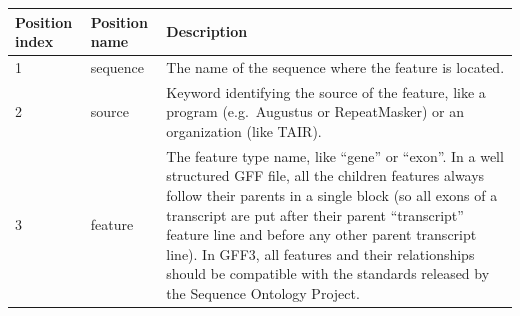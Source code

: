 \documentclass[]{book}
\begin{document}
\begin{longtable}[]{@{}lll@{}}
\toprule
\begin{minipage}[b]{0.03\columnwidth}\raggedright
Position index\strut
\end{minipage} & \begin{minipage}[b]{0.03\columnwidth}\raggedright
Position name\strut
\end{minipage} & \begin{minipage}[b]{0.85\columnwidth}\raggedright
Description\strut
\end{minipage}\tabularnewline
\midrule
\endhead
\begin{minipage}[t]{0.03\columnwidth}\raggedright
1\strut
\end{minipage} & \begin{minipage}[t]{0.03\columnwidth}\raggedright
sequence\strut
\end{minipage} & \begin{minipage}[t]{0.85\columnwidth}\raggedright
The name of the sequence where the feature is located.\strut
\end{minipage}\tabularnewline
\begin{minipage}[t]{0.03\columnwidth}\raggedright
2\strut
\end{minipage} & \begin{minipage}[t]{0.03\columnwidth}\raggedright
source\strut
\end{minipage} & \begin{minipage}[t]{0.85\columnwidth}\raggedright
Keyword identifying the source of the feature, like a program (e.g.~Augustus or RepeatMasker) or an organization (like TAIR).\strut
\end{minipage}\tabularnewline
\begin{minipage}[t]{0.03\columnwidth}\raggedright
3\strut
\end{minipage} & \begin{minipage}[t]{0.03\columnwidth}\raggedright
feature\strut
\end{minipage} & \begin{minipage}[t]{0.85\columnwidth}\raggedright
The feature type name, like ``gene'' or ``exon''. In a well structured GFF file, all the children features always follow their parents in a single block (so all exons of a transcript are put after their parent ``transcript'' feature line and before any other parent transcript line). In GFF3, all features and their relationships should be compatible with the standards released by the Sequence Ontology Project.\strut
\end{minipage}\tabularnewline

\end{longtable}
\end{document}
